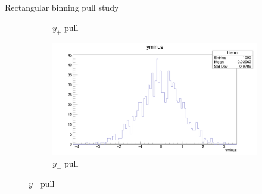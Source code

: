 \documentclass{beamer}
\begin{document}
\begin{frame}{Rectangular binning pull study}
\begin{figure}
\begin{subfigure}{0.5\textwidth}
      \caption{$y_+$ pull}
    \end{subfigure}%
    \begin{subfigure}{0.5\textwidth}
      \includegraphics[width = 1.0\textwidth]{SophisticatedPulls/yminus1K1K.png}
      \caption{$y_-$ pull}
    \end{subfigure}
  \end{figure}
\end{frame}
\end{document}
